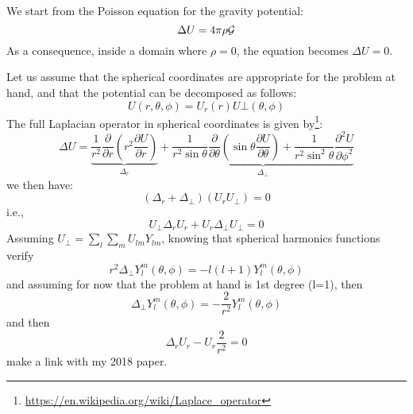 
















We start from the Poisson equation for the gravity potential:
\begin{equation}
\Delta U = 4\pi \rho {\cal G}
\end{equation}
As a consequence, inside a domain where $\rho=0$, the equation becomes $\Delta U=0$.

Let us assume that the spherical coordinates are appropriate for the problem at hand, and that 
the potential can be decomposed as follows:
\[
U(r,\theta,\phi) = U_r(r) U\bot(\theta,\phi)
\]
The full Laplacian operator in spherical coordinates is given 
by\footnote{\url{https://en.wikipedia.org/wiki/Laplace_operator}}:
\[
\Delta U 
= 
\underbrace{\frac{1}{r^2} \frac{\partial }{\partial r}\left(r^2 \frac{\partial U}{\partial r}\right)}_{\Delta_r}
+
\underbrace{
\frac{1}{r^2 \sin\theta} \frac{\partial }{\partial \theta} \left(\sin\theta \frac{\partial U}{\partial \theta} \right) 
+
\frac{1}{r^2 \sin^2\theta} \frac{\partial^2 U }{\partial \phi^2}
}_{\Delta_\bot}
\]
we then have:
\[
(\Delta_r + \Delta_\bot)(U_r U_\bot)=0
\]
i.e., 
\[
U_\bot \Delta_r U_r + U_r \Delta_\bot U_\bot=0
\]
Assuming $U_\bot=\sum_l\sum_m U_{lm}Y_{lm}$, knowing that spherical 
harmonics functions verify
\[
r^2 \Delta_\bot Y_l^m(\theta,\phi) = -l(l+1) Y_l^m (\theta,\phi)
\]
and assuming for now that the problem at hand is 1st degree (l=1), then 
\[
\Delta_\bot Y_l^m(\theta,\phi) = -\frac{2}{r^2} Y_l^m (\theta,\phi)
\]
and then
\[
\Delta_r U_r - U_r \frac{2}{r^2}=0
\]
make a link with my 2018 paper. 
\newpage

